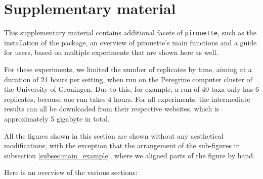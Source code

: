 \section{Supplementary material}

This supplementary material contains additional facets of \verb;pirouette;, 
such as the installation of the package, an overview of
pirouette's main functions and a guide for users, based on multiple experiments
that are shown here as well.

For these experiments, we limited the number of replicates by time, 
aiming at a duration of
24 hours per setting, when run on the Peregrine computer cluster of the
University of Groningen. Due to this, for example, a run of 40 taxa only
has 6 replicates, because one run takes 4 hours. For all experiments, the intermediate results can all be downloaded 
from their respective websites, which is approximately 5 gigabyte in total.

All the figures shown in this section are shown without any aesthetical modifications, with the exception that the arrangement
of the sub-figures in subsection \ref{subsec:main_example},
where we aligned parts of the figure by hand.

Here is an overview of the various sections:

